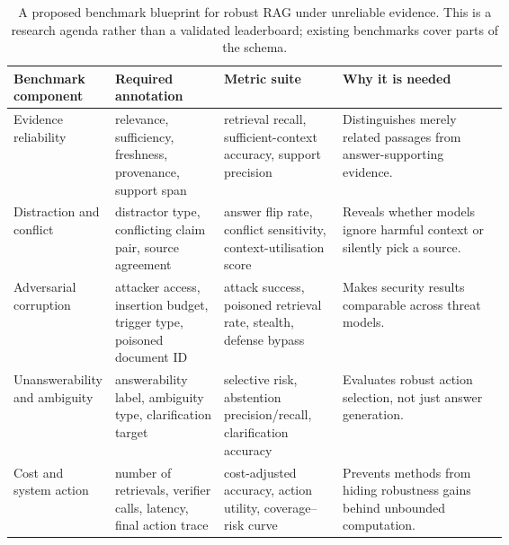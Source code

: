 \begin{table}[t]
\centering
\scriptsize
\begin{tabularx}{\linewidth}{p{0.18\linewidth}p{0.22\linewidth}p{0.24\linewidth}X}
\toprule
\textbf{Benchmark component} & \textbf{Required annotation} & \textbf{Metric suite} & \textbf{Why it is needed} \\
\midrule
Evidence reliability & relevance, sufficiency, freshness, provenance, support span & retrieval recall, sufficient-context accuracy, support precision & Distinguishes merely related passages from answer-supporting evidence. \\
Distraction and conflict & distractor type, conflicting claim pair, source agreement & answer flip rate, conflict sensitivity, context-utilisation score & Reveals whether models ignore harmful context or silently pick a source. \\
Adversarial corruption & attacker access, insertion budget, trigger type, poisoned document ID & attack success, poisoned retrieval rate, stealth, defense bypass & Makes security results comparable across threat models. \\
Unanswerability and ambiguity & answerability label, ambiguity type, clarification target & selective risk, abstention precision/recall, clarification accuracy & Evaluates robust action selection, not just answer generation. \\
Cost and system action & number of retrievals, verifier calls, latency, final action trace & cost-adjusted accuracy, action utility, coverage--risk curve & Prevents methods from hiding robustness gains behind unbounded computation. \\
\bottomrule
\end{tabularx}
\caption{A proposed benchmark blueprint for robust RAG under unreliable evidence. This is a research agenda rather than a validated leaderboard; existing benchmarks cover parts of the schema.}
\label{tab:benchmark-blueprint}
\end{table}
